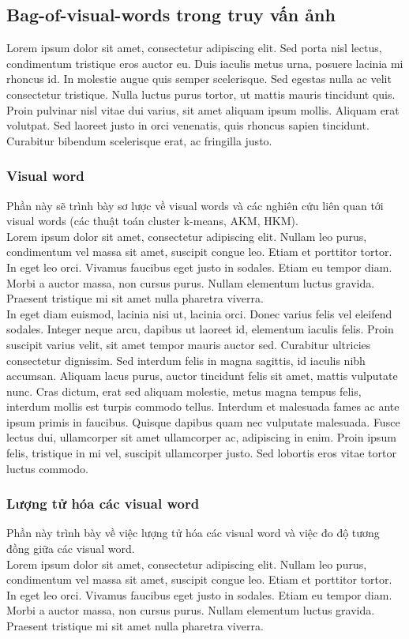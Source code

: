 \subsection{Bag-of-visual-words trong truy vấn ảnh}
Lorem ipsum dolor sit amet, consectetur adipiscing elit. Sed porta nisl lectus, condimentum tristique eros auctor eu. Duis iaculis metus urna, posuere lacinia mi rhoncus id. In molestie augue quis semper scelerisque. Sed egestas nulla ac velit consectetur tristique. Nulla luctus purus tortor, ut mattis mauris tincidunt quis. Proin pulvinar nisl vitae dui varius, sit amet aliquam ipsum mollis. Aliquam erat volutpat. Sed laoreet justo in orci venenatis, quis rhoncus sapien tincidunt. Curabitur bibendum scelerisque erat, ac fringilla justo.\\
   \subsubsection{Visual word}
   
   Phần này sẽ trình bày sơ lược về visual words và các nghiên cứu liên quan tới visual words (các thuật toán cluster k-means, AKM, HKM).\\
Lorem ipsum dolor sit amet, consectetur adipiscing elit. Nullam leo purus, condimentum vel massa sit amet, suscipit congue leo. Etiam et porttitor tortor. In eget leo orci. Vivamus faucibus eget justo in sodales. Etiam eu tempor diam. Morbi a auctor massa, non cursus purus. Nullam elementum luctus gravida. Praesent tristique mi sit amet nulla pharetra viverra.\\

In eget diam euismod, lacinia nisi ut, lacinia orci. Donec varius felis vel eleifend sodales. Integer neque arcu, dapibus ut laoreet id, elementum iaculis felis. Proin suscipit varius velit, sit amet tempor mauris auctor sed. Curabitur ultricies consectetur dignissim. Sed interdum felis in magna sagittis, id iaculis nibh accumsan. Aliquam lacus purus, auctor tincidunt felis sit amet, mattis vulputate nunc. Cras dictum, erat sed aliquam molestie, metus magna tempus felis, interdum mollis est turpis commodo tellus. Interdum et malesuada fames ac ante ipsum primis in faucibus. Quisque dapibus quam nec vulputate malesuada. Fusce lectus dui, ullamcorper sit amet ullamcorper ac, adipiscing in enim. Proin ipsum felis, tristique in mi vel, suscipit ullamcorper justo. Sed lobortis eros vitae tortor luctus commodo.\\
   \subsubsection{Lượng tử hóa các visual word}
   Phần này trình bày về việc lượng tử hóa các visual word và việc đo độ tương đồng giữa các visual word. \\   
Lorem ipsum dolor sit amet, consectetur adipiscing elit. Nullam leo purus, condimentum vel massa sit amet, suscipit congue leo. Etiam et porttitor tortor. In eget leo orci. Vivamus faucibus eget justo in sodales. Etiam eu tempor diam. Morbi a auctor massa, non cursus purus. Nullam elementum luctus gravida. Praesent tristique mi sit amet nulla pharetra viverra.\\

